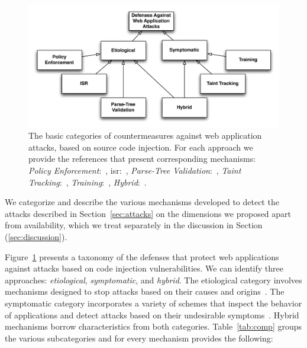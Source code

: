 \documentclass[conference]{IEEEtran}
\begin{document}
\begin{figure} [ht]
\begin{center}
\leavevmode
\includegraphics[scale=0.65]{defenses.pdf}
\end{center}
\caption{\label{fig:defenses}The basic categories of countermeasures
against web application attacks, based on source code
injection. For each approach we provide the references
that present corresponding mechanisms:
{\it Policy Enforcement}:~\cite{NSS06,JKK06a,KKVJ06,KJKV09,TNH07,RDWDE07,YCIS07,OWVS08,PSC09,ML10,DDHPJ10,PS11,VDDPJ11,BV08,LV09},
{\sc isr}:~\cite{BK04,JB07,GC09,APKLM10},
{\it Parse-Tree Validation}:~\cite{BWS05,SW06},
{\it Taint Tracking}:~\cite{HCF05,PB05,XBS06,NLC07,VFJKKV07,PMP11,SLMS14},
{\it Training}:~\cite{LLW02,HO05,HO06,HO05b,VMV05,JEP08,WPLKK09,MS09,MKS09,MKLS11},
{\it Hybrid}:~\cite{BV08,LV09,SMS13}.}
\end{figure}

We categorize and describe the various mechanisms developed to detect
the attacks described in Section~\ref{sec:attacks} on the dimensions
we proposed apart from availability, which we treat separately in the
discussion in Section (\ref{sec:discussion}).

Figure~\ref{fig:defenses} presents a taxonomy of the
defenses that protect web applications against attacks based on
code injection vulnerabilities.
We can identify three approaches:
{\it etiological}, {\it symptomatic}, and {\it hybrid}.
The etiological category involves mechanisms designed to
stop attacks based on their causes and origins~\cite{JL75,L81}. 
The symptomatic category incorporates a variety of schemes that
inspect the behavior of applications and detect attacks based on
their undesirable symptoms~\cite{D76,A00}.
Hybrid mechanisms borrow characteristics from both
categories. Table~\ref{tab:comp} groups the various subcategories and
for every mechanism provides the following:
\end{document}
